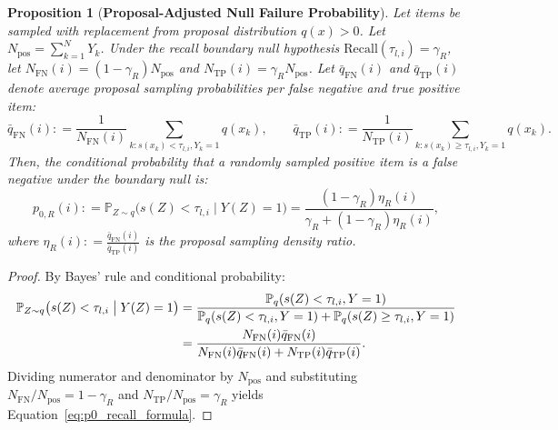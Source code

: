 \documentclass[11pt,a4paper]{article}
\newcommand{\coloneqq}{\mathrel{\mathop:}=}
\newtheorem{proposition}[theorem]{Proposition}
\begin{document}
\begin{proposition}[\textbf{Proposal-Adjusted Null Failure Probability}]\label{prop:proposal_adjusted_p0}
Let items be sampled with replacement from proposal distribution $q(x) > 0$. Let $N_{\text{pos}} = \sum_{k=1}^N Y_k$. Under the recall boundary null hypothesis $\text{Recall}(\tau_{l, i}) = \gamma_R$, let $N_{\text{FN}}(i) = (1 - \gamma_R) N_{\text{pos}}$ and $N_{\text{TP}}(i) = \gamma_R N_{\text{pos}}$. 
Let $\bar{q}_{\text{FN}}(i)$ and $\bar{q}_{\text{TP}}(i)$ denote average proposal sampling probabilities per false negative and true positive item:
\begin{equation}
\bar{q}_{\text{FN}}(i) \coloneqq \frac{1}{N_{\text{FN}}(i)}\sum_{k: s(x_k) < \tau_{l, i}, Y_k = 1} q(x_k), \qquad \bar{q}_{\text{TP}}(i) \coloneqq \frac{1}{N_{\text{TP}}(i)}\sum_{k: s(x_k) \ge \tau_{l, i}, Y_k = 1} q(x_k).
\end{equation}
Then, the conditional probability that a randomly sampled positive item is a false negative under the boundary null is:
\begin{equation}\label{eq:p0_recall_formula}
p_{0, R}(i) \coloneqq \mathbb{P}_{Z \sim q}\big(s(Z) < \tau_{l, i} \;\big|\; Y(Z) = 1\big) = \frac{(1 - \gamma_R)\eta_R(i)}{\gamma_R + (1 - \gamma_R)\eta_R(i)},
\end{equation}
where $\eta_R(i) \coloneqq \frac{\bar{q}_{\text{FN}}(i)}{\bar{q}_{\text{TP}}(i)}$ is the proposal sampling density ratio.
\end{proposition}

\begin{proof}
By Bayes' rule and conditional probability:
\begin{align}
\mathbb{P}_{Z \sim q}\big(s(Z) < \tau_{l, i} \;\big|\; Y(Z) = 1\big) &= \frac{\mathbb{P}_q(s(Z) < \tau_{l, i}, Y=1)}{\mathbb{P}_q(s(Z) < \tau_{l, i}, Y=1) + \mathbb{P}_q(s(Z) \ge \tau_{l, i}, Y=1)} \notag \\
&= \frac{N_{\text{FN}}(i) \bar{q}_{\text{FN}}(i)}{N_{\text{FN}}(i) \bar{q}_{\text{FN}}(i) + N_{\text{TP}}(i) \bar{q}_{\text{TP}}(i)}.
\end{align}
Dividing numerator and denominator by $N_{\text{pos}}$ and substituting $N_{\text{FN}} / N_{\text{pos}} = 1 - \gamma_R$ and $N_{\text{TP}} / N_{\text{pos}} = \gamma_R$ yields Equation~\eqref{eq:p0_recall_formula}.
\end{proof}
\end{document}
